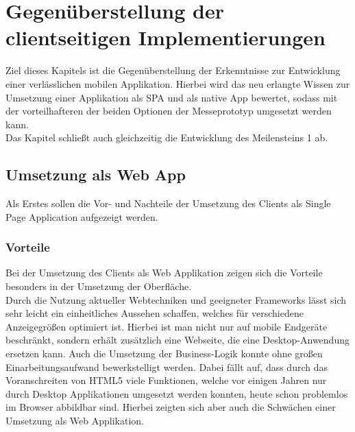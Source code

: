 \chapter{Gegenüberstellung der clientseitigen Implementierungen}
\label{cha:gegenueberstellung}
Ziel dieses Kapitels ist die Gegenüberstellung der Erkenntnisse zur Entwicklung einer verlässlichen mobilen Applikation. Hierbei wird das neu erlangte Wissen zur Umsetzung einer Applikation als \ac{SPA} und als native \gls{App} bewertet, sodass mit der vorteilhafteren der beiden Optionen der Messeprototyp umgesetzt werden kann. \\
Das Kapitel schließt auch gleichzeitig die Entwicklung des Meilensteins 1 ab.

\section{Umsetzung als Web App}
\label{sec:gegenueberstellung-SPA}
Als Erstes sollen die Vor- und Nachteile der Umsetzung des Clients als Single Page Application aufgezeigt werden.

\subsection{Vorteile}
\label{sec:vorteile-SPA}
Bei der Umsetzung des Clients als Web Applikation zeigen sich die Vorteile besonders in der Umsetzung der Oberfläche. \\
Durch die Nutzung aktueller Webtechniken und geeigneter Frameworks lässt sich sehr leicht ein einheitliches Aussehen schaffen, welches für verschiedene Anzeigegrößen optimiert ist. Hierbei ist man nicht nur auf mobile Endgeräte beschränkt, sondern erhält zusätzlich eine Webseite, die eine Desktop-Anwendung ersetzen kann. Auch die Umsetzung der Business-Logik konnte ohne großen Einarbeitungsaufwand bewerkstelligt werden. Dabei fällt auf, dass durch das Voranschreiten von \gls{HTML5} viele Funktionen, welche vor einigen Jahren nur durch Desktop Applikationen umgesetzt werden konnten, heute schon problemlos im Browser abbildbar sind. Hierbei zeigten sich aber auch die Schwächen einer Umsetzung als Web Applikation. 

